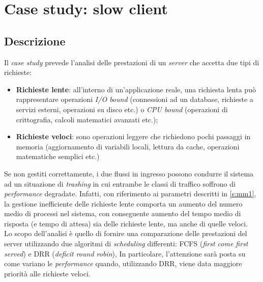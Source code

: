 \chapter{Case study: slow client}\label{ch:case_study}

\section{Descrizione}\label{s:descrizione}

Il \textit{case study} prevede l'analisi delle prestazioni di un \textit{server} che accetta due tipi di richieste:
\begin{itemize}
    \item \textbf{Richieste lente}\footnotemark{}: all'interno di un'applicazione reale, una richiesta lenta può rappresentare operazioni \textit{I/O bound} (connessioni ad un database, richieste a servizi esterni, operazioni su disco etc.) o \textit{CPU bound} (operazioni di crittografia, calcoli matematici avanzati etc.);
    \item \textbf{Richieste veloci}\footnotemark[\value{footnote}]: sono operazioni leggere che richiedono pochi passaggi in memoria (aggiornamento di variabili locali, lettura da cache, operazioni matematiche semplici etc.)
\end{itemize}


Se non gestiti correttamente, i due flussi in ingresso possono condurre il sistema ad un situazione di \textit{trashing} in cui entrambe le classi di traffico soffrono di \textit{performance} degradate. Infatti, con riferimento ai parametri descritti in \cref{s:mm1}, la gestione inefficiente delle richieste lente comporta un aumento del numero medio di processi nel sistema, con conseguente aumento del tempo medio di risposta (e tempo di attesa) sia delle richieste lente, ma anche di quelle veloci\cite{644616}.\\

Lo scopo dell'analisi è quello di fornire una comparazione delle prestazioni del server utilizzando due algoritmi di \textit{scheduling} differenti: FCFS (\textit{first come first served}) e DRR (\textit{deficit round robin}), In particolare, l'attenzione sarà posta su come variano le \textit{performance} quando, utilizzando DRR, viene data maggiore priorità alle richieste veloci.

